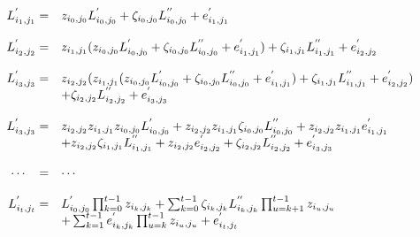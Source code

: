 \documentclass[12pt]{article}
\begin{document}
\begin{bibunit}
\begin{equation}
\begin{array}{rl}
L^{'}_{i_{1},j_{1}} =& z_{i_{0},j_{0}}L^{'}_{i_{0},j_{0}}+\zeta_{i_{0},j_{0}}L^{''}_{i_{0},j_{0}}+e^{'}_{i_{1},j_{1}}\\
\\
L^{'}_{i_{2},j_{2}} =& z_{i_{1},j_{1}}(z_{i_{0},j_{0}}L^{'}_{i_{0},j_{0}}+\zeta_{i_{0},j_{0}}L^{''}_{i_{0},j_{0}}+e^{'}_{i_{1},j_{1}})+\zeta_{i_{1},j_{1}}L^{''}_{i_{1},j_{1}}+e^{'}_{i_{2},j_{2}}\\
\\
L^{'}_{i_{3},j_{3}} =& 
z_{i_{2},j_{2}}(z_{i_{1},j_{1}}(z_{i_{0},j_{0}}L^{'}_{i_{0},j_{0}}+\zeta_{i_{0},j_{0}}L^{''}_{i_{0},j_{0}}+e^{'}_{i_{1},j_{1}})+\zeta_{i_{1},j_{1}}L^{''}_{i_{1},j_{1}}+e^{'}_{i_{2},j_{2}})\\
&+\zeta_{i_{2},j_{2}}L^{''}_{i_{2},j_{2}}+e^{'}_{i_{3},j_{3}}\\
\\
L^{'}_{i_{3},j_{3}} =&z_{i_{2},j_{2}}z_{i_{1},j_{1}}z_{i_{0},j_{0}}L^{'}_{i_{0},j_{0}}+z_{i_{2},j_{2}}z_{i_{1},j_{1}}\zeta_{i_{0},j_{0}}L^{''}_{i_{0},j_{0}}+z_{i_{2},j_{2}}z_{i_{1},j_{1}}e_{i_{1},j_{1}}^{'}\\
&+z_{i_{2},j_{2}}\zeta_{i_{1},j_{1}}L^{''}_{i_{1},j_{1}}+z_{i_{2},j_{2}}e_{i_{2},j_{2}}^{'}+\zeta_{i_{2},j_{2}}L^{''}_{i_{2},j_{2}}+e_{i_{3},j_{3}}^{'}\\
\\
\cdots \hspace{0.3cm}= &\cdots\\
\\
L^{'}_{i_{t},j_{t}} =&L^{'}_{i_{0},j_{0}}\prod_{k=0}^{t-1}z_{i_{k},j_{k}}+\sum_{k=0}^{t-1}\zeta_{i_{k},j_{k}}L^{''}_{i_{k},j_{k}}\prod_{u=k+1}^{t-1}z_{i_{u},j_{u}}\\
&+\sum_{k=1}^{t-1}e^{'}_{i_{k},j_{k}}\prod_{u=k}^{t-1}z_{i_{u},j_{u}}+e^{'}_{i_{t},j_{t}}\\


\end{array}
\end{equation}
\end{bibunit}
\end{document}
